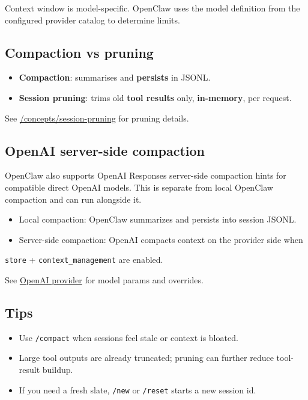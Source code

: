 Context window is model-specific. OpenClaw uses the model definition from the configured provider catalog to determine limits.

\subsection{Compaction vs pruning}


\begin{itemize}
  \item \textbf{Compaction}: summarises and \textbf{persists} in JSONL.
  \item \textbf{Session pruning}: trims old \textbf{tool results} only, \textbf{in-memory}, per request.
\end{itemize}


See \href{/concepts/session-pruning}{/concepts/session-pruning} for pruning details.

\subsection{OpenAI server-side compaction}


OpenClaw also supports OpenAI Responses server-side compaction hints for
compatible direct OpenAI models. This is separate from local OpenClaw
compaction and can run alongside it.

\begin{itemize}
  \item Local compaction: OpenClaw summarizes and persists into session JSONL.
  \item Server-side compaction: OpenAI compacts context on the provider side when
\end{itemize}

\texttt{store} + \texttt{context\_management} are enabled.

See \href{/providers/openai}{OpenAI provider} for model params and overrides.

\subsection{Tips}


\begin{itemize}
  \item Use \texttt{/compact} when sessions feel stale or context is bloated.
  \item Large tool outputs are already truncated; pruning can further reduce tool-result buildup.
  \item If you need a fresh slate, \texttt{/new} or \texttt{/reset} starts a new session id.
\end{itemize}



